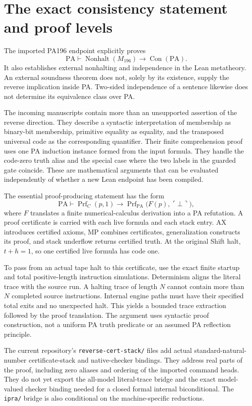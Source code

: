 \documentclass[11pt,a4paper]{article}
\newcommand{\PA}{\mathrm{PA}}
\newcommand{\Con}{\operatorname{Con}}
\newcommand{\Nonhalt}{\operatorname{Nonhalt}}
\newcommand{\Prf}{\operatorname{Prf}}
\newcommand{\file}[1]{\texttt{\nolinkurl{#1}}}
\begin{document}
\section{The exact consistency statement and proof levels}
\label{sec:prooflevels}

The imported PA196 endpoint explicitly proves
\[
        \PA\vdash\Nonhalt(M_{196})\longrightarrow\Con(\PA).
\]
It also establishes external nonhalting and independence in the Lean
metatheory. An external soundness theorem does not, solely by its existence,
supply the reverse implication inside PA. Two-sided independence of a
sentence likewise does not determine its equivalence class over PA.

The incoming manuscripts contain more than an unsupported assertion of the
reverse direction. They describe a syntactic interpretation of membership
as binary-bit membership, primitive equality as equality, and the
transposed universal code as the corresponding quantifier. Their finite
comprehension proof uses one PA induction instance formed from the input
formula. They handle the code-zero truth alias and the special case where
the two labels in the guarded gate coincide. These are mathematical
arguments that can be evaluated independently of whether a new Lean
endpoint has been compiled.

The essential proof-producing statement has the form
\[
 \PA\vdash \Prf_C(p,1)\longrightarrow
       \Prf_{\PA}\bigl(F(p),\ulcorner\bot\urcorner\bigr),
\]
where $F$ translates a finite numerical-calculus derivation into a PA
refutation. A proof certificate is carried with each live formula and
each stack entry. AX introduces certified axioms, MP combines certificates,
generalization constructs its proof, and stack underflow returns certified
truth. At the original Shift halt, $t+h=1$, so one certified live formula
has code one.

To pass from an actual tape halt to this certificate, use the exact finite
startup and total positive-length instruction simulations. Determinism
aligns the literal trace with the source run. A halting trace of length
$N$ cannot contain more than $N$ completed source instructions. Internal
engine paths must have their specified total exits and no unexpected halt.
This yields a bounded trace extraction followed by the proof translation.
The argument uses syntactic proof construction, not a uniform PA truth
predicate or an assumed PA reflection principle.

The current repository's \file{reverse-cert-stack/} files add actual
standard-natural-number certificate-stack and native-checker bindings.
They address real parts of the proof, including zero aliases and ordering
of the imported command heads. They do not yet export the all-model
literal-trace bridge and the exact model-valued checker binding needed
for a closed formal internal biconditional. The \file{ipra/} bridge is
also conditional on the machine-specific reductions.
\end{document}

